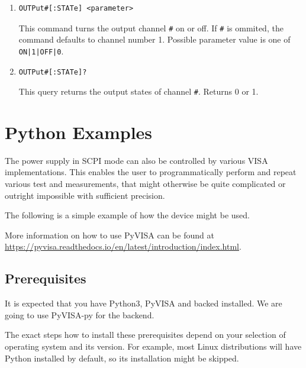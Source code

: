 \documentclass[a4paper,10pt]{article}
\begin{document}
\begin{enumerate}
\begin{enumerate}
		\item 
		    \begin{verbatim}OUTPut#[:STATe] <parameter>\end{verbatim}
		    \begin{description}
		        This command turns the output channel \verb!#! on or off. If \verb|#| is ommited, the command defaults to channel number 1.
		        \newline Possible parameter value is one of \verb!ON|1|OFF|0!.
		    \end{description}
		\item 
		    \begin{verbatim}OUTPut#[:STATe]?\end{verbatim}
		    \begin{description}
		        This query returns the output states of channel \verb!#!. Returns 0 or 1.
		    \end{description}
    \end{enumerate}
\end{enumerate}

\section{Python Examples}

The power supply in SCPI mode can also be controlled by various VISA implementations. This enables the user to programmatically perform and repeat various test and measurements, that might otherwise be quite complicated or outright impossible with sufficient precision.

The following is a simple example of how the device might be used.

More information on how to use PyVISA can be found at\newline
\href{https://pyvisa.readthedocs.io/en/latest/introduction/index.html}{https://pyvisa.readthedocs.io/en/latest/introduction/index.html}.

\subsection{Prerequisites}

It is expected that you have Python3, PyVISA and backed installed. We are going to use PyVISA-py for the backend.

The exact steps how to install these prerequisites depend on your selection of operating system and its version. For example, most Linux distributions will have Python installed by default, so its installation might be skipped.
\end{document}
